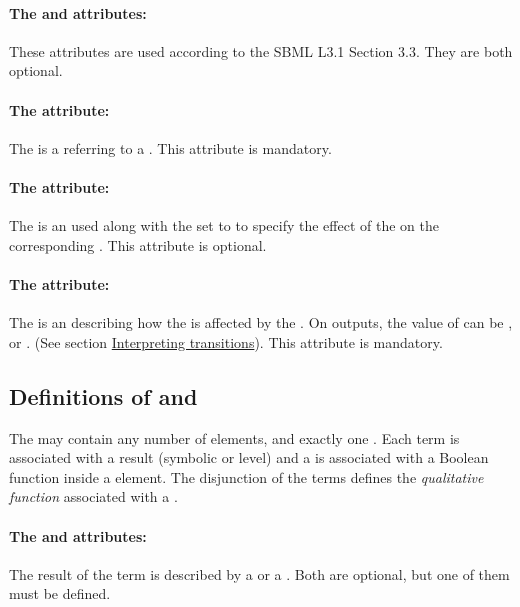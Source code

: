 \paragraph{The  and  attributes:}
These attributes are used according to the SBML L3.1 Section 3.3. They are both optional. 

\paragraph{The  attribute:}
The  is a  referring to a . This attribute is mandatory.

\paragraph{The  attribute:}
The  is an  used along with the  set to  to specify the effect of the  on the corresponding . This attribute is optional.

\paragraph{The  attribute:}
The  is an  describing how the  is affected by the . On outputs, the value of  can be ,  or . (See section \hyperlink{inter_trans}{Interpreting transitions}). This attribute is mandatory.

\bigskip
\subsection*{Definitions of  and } %
The  may contain any number of  elements, and exactly one . Each term is associated with a result (symbolic or level) and a  is associated with a Boolean function inside a  element. The disjunction of the terms defines the \emph{qualitative function} associated with a .

\paragraph{The  and  attributes:}
The result of the term is described by a  or a . Both are optional, but one of them must be defined.

